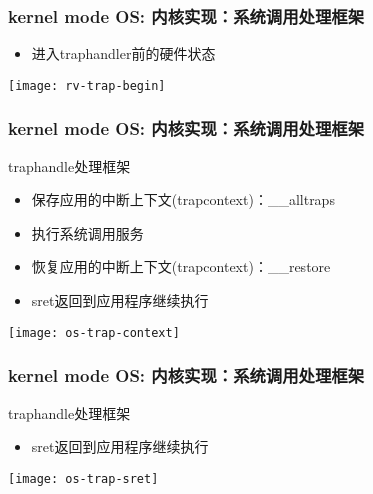 \begin{frame}
    \frametitle{kernel mode OS: 内核实现：系统调用处理框架}
    
    \begin{itemize}
        
        \item 进入trap\-handler前的硬件状态
        
        
    \end{itemize}	
    \centering
    \texttt{[image: rv-trap-begin]}
\end{frame}

\begin{frame}
    \frametitle{kernel mode OS: 内核实现：系统调用处理框架}
    trap\-handle处理框架
    \begin{itemize}
        
        \item 保存应用的中断上下文(trap\-context)：\_\_alltraps
        \item 执行系统调用服务
        \item 恢复应用的中断上下文(trap\-context)：\_\_restore
        \item sret返回到应用程序继续执行
    \end{itemize}	
    \centering
    \texttt{[image: os-trap-context]}
\end{frame}

\begin{frame}
    \frametitle{kernel mode OS: 内核实现：系统调用处理框架}
    trap\-handle处理框架
    \begin{itemize}
        \item sret返回到应用程序继续执行
    \end{itemize}	
    \centering
    \texttt{[image: os-trap-sret]}
\end{frame}

